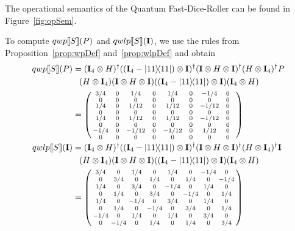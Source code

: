 \documentclass[a4paper,UKenglish,cleveref, autoref, thm-restate]{lipics-v2021}
\begin{document}
  The operational semantics of the Quantum Fast-Dice-Roller can be found in Figure~\ref{fig:opSem}.

  To compute $qwp\llbracket S \rrbracket (P)$ and $qwlp\llbracket S \rrbracket (\textbf{I})$, we use the rules from Proposition~\ref{prop:wpDef} and~\ref{prop:wlpDef} and obtain
\begin{align*}
  \qwp{S}{P} &= (\identityOpVar{4} \otimes H)^\dagger ((\identityOpVar{4}-\ketbra{11}{11})\otimes \identityOp)^\dagger (\identityOp \otimes H \otimes \identityOp)^\dagger (H \otimes \identityOpVar{4})^\dagger P \\
  & \phantom{=}(H \otimes \identityOpVar{4}) (\identityOp \otimes H \otimes \identityOp) ((\identityOpVar{4}-\ketbra{11}{11})\otimes \identityOp)(\identityOpVar{4} \otimes H)\\
  &= \left(\begin{smallmatrix}
    3/4 & \makebox[0.2cm]{ }0\makebox[0.2cm]{ } & 1/4 & \makebox[0.2cm]{ }0\makebox[0.2cm]{ } & 1/4 & \makebox[0.2cm]{ }0\makebox[0.2cm]{ } & -1/4 & \makebox[0.2cm]{ }0\makebox[0.2cm]{ }\\
    0 & 0 & 0 & 0 & 0 & 0 & 0 & 0\\
    1/4 & 0 & 1/12 & 0 & 1/12& 0 & -1/12 & 0 \\
    0 & 0 & 0 & 0 & 0 & 0 & 0 & 0\\
    1/4 & 0 & 1/12 & 0 & 1/12& 0 & -1/12 & 0 \\
    0 & 0 & 0 & 0 & 0 & 0 & 0 & 0\\
    -1/4 & 0 & -1/12 & 0 & -1/12& 0 & 1/12 & 0 \\
    0 & 0 & 0 & 0 & 0 & 0 & 0 & 0\\
  \end{smallmatrix}\right)\\
  \qwlp{S}{\identityOp} &=(\identityOpVar{4} \otimes H)^\dagger ((\identityOpVar{4}-\ketbra{11}{11})\otimes \identityOp)^\dagger (\identityOp \otimes H \otimes \identityOp)^\dagger (H \otimes \identityOpVar{4})^\dagger \identityOp \\
  & \phantom{=}(H \otimes \identityOpVar{4}) (\identityOp \otimes H \otimes \identityOp) ((\identityOpVar{4}-\ketbra{11}{11})\otimes \identityOp)(\identityOpVar{4} \otimes H)\\
  &= \left(\begin{smallmatrix}
    3/4 & 0 & 1/4 & 0 & 1/4 & 0 & -1/4 & 0 \\
    0 & 3/4 & 0 & 1/4 & 0 & 1/4 & 0 & -1/4\\
    1/4 & 0 & 3/4 & 0 & - 1/4 & 0 & 1/4 & 0 \\
    0 & 1/4 & 0 & 3/4 & 0 & -1/4 & 0 & 1/4\\
    1/4 & 0 & -1/4 & 0 & 3/4& 0 & 1/4 & 0 \\
    0 & 1/4 & 0 & -1/4 & 0 & 3/4 & 0 & 1/4\\
    -1/4 & 0 & 1/4 & 0 & 1/4& 0 & 3/4 & 0 \\
    0 & -1/4 & 0 & 1/4 & 0 & 1/4 & 0 & 3/4\\
  \end{smallmatrix}\right)
\end{align*}

 
\end{document}
